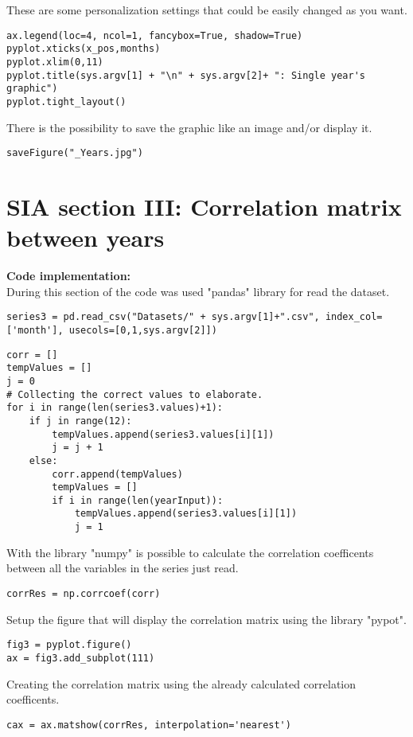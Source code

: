 These are some personalization settings that could be easily changed as you want.
\begin{lstlisting}
ax.legend(loc=4, ncol=1, fancybox=True, shadow=True)
pyplot.xticks(x_pos,months)
pyplot.xlim(0,11)
pyplot.title(sys.argv[1] + "\n" + sys.argv[2]+ ": Single year's graphic")
pyplot.tight_layout()
\end{lstlisting}

There is the possibility to save the graphic like an image and/or display it.
\begin{lstlisting}
saveFigure("_Years.jpg")
\end{lstlisting}


\section{SIA section III: Correlation matrix between years}
\label{SIA_section_III}
\textbf{Code implementation:}\\
During this section of the code was used "pandas" library for read the dataset.
\begin{lstlisting}
series3 = pd.read_csv("Datasets/" + sys.argv[1]+".csv", index_col=['month'], usecols=[0,1,sys.argv[2]])
\end{lstlisting}

\begin{lstlisting}
corr = []
tempValues = []
j = 0
# Collecting the correct values to elaborate.
for i in range(len(series3.values)+1):
	if j in range(12):
		tempValues.append(series3.values[i][1])
		j = j + 1
	else:
		corr.append(tempValues)
		tempValues = []
		if i in range(len(yearInput)):
			tempValues.append(series3.values[i][1])
			j = 1
\end{lstlisting}

With the library "numpy" is possible to calculate the correlation coefficents between all the variables in the series just read.
\begin{lstlisting}
corrRes = np.corrcoef(corr)
\end{lstlisting}

Setup the figure that will display the correlation matrix using the library "pypot".
\begin{lstlisting}
fig3 = pyplot.figure()
ax = fig3.add_subplot(111)
\end{lstlisting}

Creating the correlation matrix using the already calculated correlation coefficents.
\begin{lstlisting}
cax = ax.matshow(corrRes, interpolation='nearest')
\end{lstlisting}

